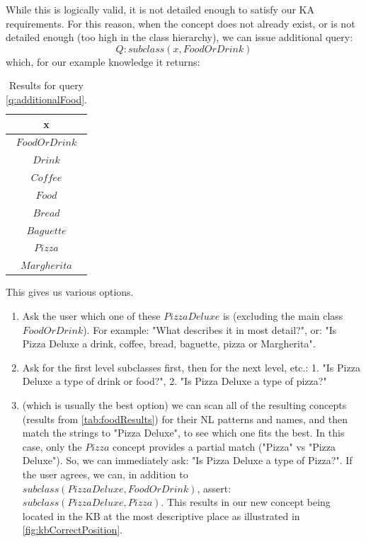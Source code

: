 While this is logically valid, it is not detailed enough to satisfy our KA 
requirements. For this reason, when the concept does not already exist, or is 
not detailed enough (too high in the class hierarchy), we can issue additional 
query:
\begin{equation}\label{q:additionalFood}
Q:subclass(x,FoodOrDrink)
\end{equation}
which, for our example knowledge it returns:
\begin{table}[H]
\centering
\caption{Results for query \ref{q:additionalFood}.}
\label{tab:foodResults}
\begin{tabular}{|c|}
	\hline
	\textbf{x} \\
    \hline
    $FoodOrDrink$ \\
    \hline
    $Drink$ \\
    \hline
    $Coffee$ \\
    \hline
    $Food$ \\
    \hline
    $Bread$ \\
    \hline
    $Baguette$ \\
    \hline
    $Pizza$ \\
    \hline
    $Margherita$ \\
    \hline
\end{tabular}
\end{table}
This gives us various options.
\begin{enumerate}
\item Ask the user which one of these $PizzaDeluxe$ is (excluding the main 
class $FoodOrDrink$). For example: "What describes it in most detail?", or: 
"Is Pizza Deluxe a drink, coffee, bread, baguette, pizza or Margherita".
\item Ask for the first level subclasses first, then for the next level, 
etc.: 1. "Is Pizza Deluxe a type of drink or food?", 2. "Is Pizza Deluxe a 
type of pizza?"
\item (which is usually the best option) we can scan all of the resulting 
concepts (results from \autoref{tab:foodResults}) for their NL patterns and 
names, and then match the strings to "Pizza Deluxe", to see which one fits the 
best. In this case, only the $Pizza$ concept provides a partial match ("Pizza"
vs "Pizza Deluxe"). So, we can immediately ask: "Is Pizza Deluxe a type of 
Pizza?". If the user agrees, we can, in addition to 
$subclass(PizzaDeluxe,FoodOrDrink)$, assert: $subclass(PizzaDeluxe,Pizza)$. 
This results in our new concept being located in the KB at the most descriptive
place as illustrated in \autoref{fig:kbCorrectPosition}.
\end{enumerate}

